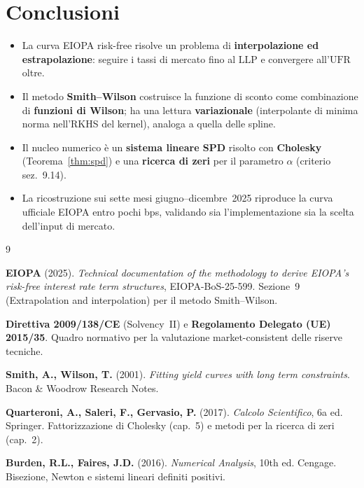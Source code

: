 \documentclass[11pt,a4paper]{article}
\theoremstyle{plain}
\theoremstyle{definition}
\theoremstyle{remark}
\newcommand{\UFR}{\ensuremath{\mathrm{UFR}}}
\newcommand{\LLP}{\ensuremath{\mathrm{LLP}}}
\begin{document}
\section{Conclusioni}

\begin{itemize}
  \item La curva EIOPA risk-free risolve un problema di \textbf{interpolazione ed
        estrapolazione}: seguire i tassi di mercato fino al $\LLP$ e convergere all'$\UFR$ oltre.
  \item Il metodo \textbf{Smith--Wilson} costruisce la funzione di sconto come combinazione di
        \textbf{funzioni di Wilson}; ha una lettura \textbf{variazionale} (interpolante di
        minima norma nell'RKHS del kernel), analoga a quella delle spline.
  \item Il nucleo numerico \`e un \textbf{sistema lineare SPD} risolto con \textbf{Cholesky}
        (Teorema~\ref{thm:spd}) e una \textbf{ricerca di zeri} per il parametro $\alpha$
        (criterio sez.~9.14).
  \item La ricostruzione sui sette mesi giugno--dicembre~2025 riproduce la curva ufficiale EIOPA
        entro pochi bps, validando sia l'implementazione sia la scelta dell'input di mercato.
\end{itemize}

\renewcommand{\refname}{Riferimenti bibliografici}
\begin{thebibliography}{9}

  \textbf{EIOPA} (2025).
  \textit{Technical documentation of the methodology to derive EIOPA's risk-free interest rate
  term structures}, EIOPA-BoS-25-599.
  Sezione~9 (Extrapolation and interpolation) per il metodo Smith--Wilson.

  \textbf{Direttiva 2009/138/CE} (Solvency~II) e
  \textbf{Regolamento Delegato (UE) 2015/35}.
  Quadro normativo per la valutazione market-consistent delle riserve tecniche.

  \textbf{Smith, A., Wilson, T.} (2001).
  \textit{Fitting yield curves with long term constraints}.
  Bacon \& Woodrow Research Notes.

  \textbf{Quarteroni, A., Saleri, F., Gervasio, P.} (2017).
  \textit{Calcolo Scientifico}, 6a ed. Springer.
  Fattorizzazione di Cholesky (cap.~5) e metodi per la ricerca di zeri (cap.~2).

  \textbf{Burden, R.L., Faires, J.D.} (2016).
  \textit{Numerical Analysis}, 10th ed. Cengage.
  Bisezione, Newton e sistemi lineari definiti positivi.

\end{thebibliography}
\end{document}
